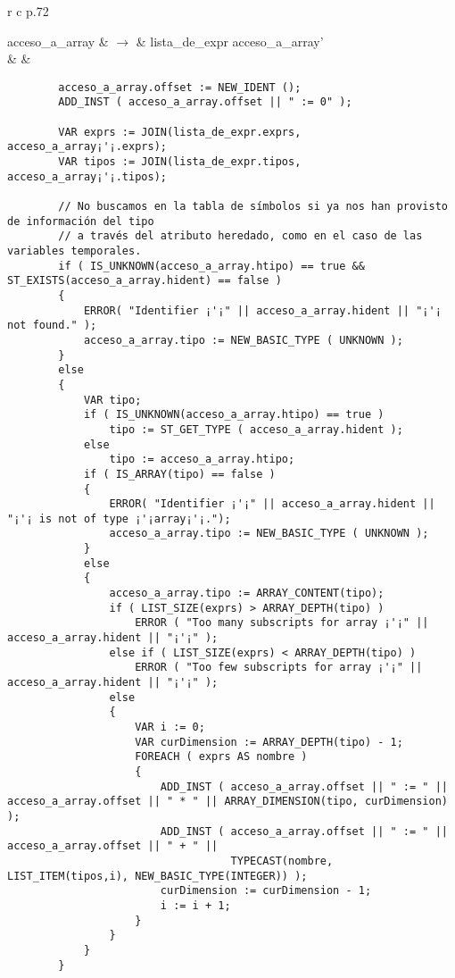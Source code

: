 \small
\begin{tabular}{r c p{}}
										
			acceso\_a\_array		& $\longrightarrow$ 	& \ter{[} lista\_de\_expr \ter{]} acceso\_a\_array' \\
								&					& \begin{lstlisting}
		acceso_a_array.offset := NEW_IDENT ();
        ADD_INST ( acceso_a_array.offset || " := 0" );

        VAR exprs := JOIN(lista_de_expr.exprs, acceso_a_array¡'¡.exprs);
        VAR tipos := JOIN(lista_de_expr.tipos, acceso_a_array¡'¡.tipos);
        
        // No buscamos en la tabla de símbolos si ya nos han provisto de información del tipo
        // a través del atributo heredado, como en el caso de las variables temporales.
        if ( IS_UNKNOWN(acceso_a_array.htipo) == true && ST_EXISTS(acceso_a_array.hident) == false )
        {
            ERROR( "Identifier ¡'¡" || acceso_a_array.hident || "¡'¡ not found." );
            acceso_a_array.tipo := NEW_BASIC_TYPE ( UNKNOWN );
        }
        else
        {
            VAR tipo;
            if ( IS_UNKNOWN(acceso_a_array.htipo) == true )
                tipo := ST_GET_TYPE ( acceso_a_array.hident );
            else
                tipo := acceso_a_array.htipo;
            if ( IS_ARRAY(tipo) == false )
            {
                ERROR( "Identifier ¡'¡" || acceso_a_array.hident || "¡'¡ is not of type ¡'¡array¡'¡.");
                acceso_a_array.tipo := NEW_BASIC_TYPE ( UNKNOWN );
            }
            else
            {
                acceso_a_array.tipo := ARRAY_CONTENT(tipo);
                if ( LIST_SIZE(exprs) > ARRAY_DEPTH(tipo) )
                    ERROR ( "Too many subscripts for array ¡'¡" || acceso_a_array.hident || "¡'¡" );
                else if ( LIST_SIZE(exprs) < ARRAY_DEPTH(tipo) )
                    ERROR ( "Too few subscripts for array ¡'¡" || acceso_a_array.hident || "¡'¡" );
                else
                {
                    VAR i := 0;
                    VAR curDimension := ARRAY_DEPTH(tipo) - 1;
                    FOREACH ( exprs AS nombre )
                    {
                        ADD_INST ( acceso_a_array.offset || " := " || acceso_a_array.offset || " * " || ARRAY_DIMENSION(tipo, curDimension) );
                        ADD_INST ( acceso_a_array.offset || " := " || acceso_a_array.offset || " + " ||
                        		   TYPECAST(nombre, LIST_ITEM(tipos,i), NEW_BASIC_TYPE(INTEGER)) );
                        curDimension := curDimension - 1;
                        i := i + 1;
                    }
                }
            }
        }
 
												\end{lstlisting} \\


\end{tabular}


